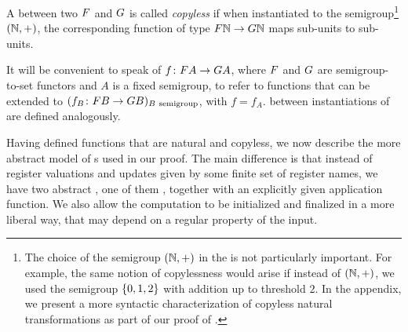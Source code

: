 \begin{definition} \label{def:copyless} A
   between two  $\functor$
  and $\functorg$ is called \emph{copyless} if when instantiated to the
  semigroup\footnote{The choice of the semigroup $({\mathbb N},+)$ in the
     is not particularly important. For example, the same
    notion of copylessness would arise if instead of $({\mathbb N},+)$, we used the
    semigroup $\{0,1,2\}$ with addition up to threshold $2$. In the appendix,
    we present a more syntactic characterization of copyless natural
    transformations as part of our proof of .}
  $({\mathbb N},+)$, the corresponding function of type $\functor \Nat \to
  \functorg \Nat$ maps sub-units to sub-units.
\end{definition}

\AP It will be convenient to speak of  $f\colon
\functor A \to \functorg A$, where $\functor$ and $\functorg$ are
semigroup-to-set functors and $A$ is a fixed semigroup, to refer to functions
that can be extended to  $(f_B\colon \functor B \to
\functorg B)_{B\ \text{semigroup}}$, with $f=f_A$.  between instantiations of  are defined
analogously.

Having defined functions that are natural and copyless, we now describe the more
abstract model of \sst{}s used in our proof. The main difference is that instead
of register valuations and updates given by some finite set of register names,
we have two abstract , one of them ,
together with an explicitly given application function. We also allow the
computation to be initialized and finalized in a more liberal way, that may depend on a
regular property of the input.

